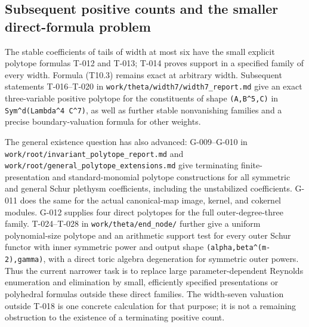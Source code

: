 \documentclass[
  10pt,
]{article}
\begin{document}
\subsection{Subsequent positive counts and the smaller direct-formula
problem}\label{subsequent-positive-counts-and-the-smaller-direct-formula-problem}

The stable coefficients of tails of width at most six have the small
explicit polytope formulas T-012 and T-013; T-014 proves support in a
specified family of every width. Formula (T10.3) remains exact at
arbitrary width. Subsequent statements T-016--T-020 in
\texttt{\small work/\allowbreak{}theta/\allowbreak{}width7/\allowbreak{}width7\_\allowbreak{}report.md}
give an exact three-variable positive polytope for the constituents of
shape
\texttt{\small (\allowbreak{}A,\allowbreak{}B\textasciicircum{}5,\allowbreak{}C)\allowbreak{}}
in
\texttt{\small Sym\textasciicircum{}d(\allowbreak{}Lambda\textasciicircum{}4 C\textasciicircum{}7)\allowbreak{}},
as well as further stable nonvanishing families and a precise
boundary-valuation formula for other weights.

The general existence question has also advanced: G-009--G-010 in
\texttt{\small work/\allowbreak{}root/\allowbreak{}invariant\_\allowbreak{}polytope\_\allowbreak{}report.md}
and
\texttt{\small work/\allowbreak{}root/\allowbreak{}general\_\allowbreak{}polytope\_\allowbreak{}extensions.md}
give terminating finite-presentation and standard-monomial polytope
constructions for all symmetric and general Schur plethysm coefficients,
including the unstabilized coefficients. G-011 does the same for the
actual canonical-map image, kernel, and cokernel modules. G-012 supplies
four direct polytopes for the full outer-degree-three family.
T-024--T-028 in
\texttt{\small work/\allowbreak{}theta/\allowbreak{}end\_\allowbreak{}node/\allowbreak{}}
further give a uniform polynomial-size polytope and an arithmetic
support test for every outer Schur functor with inner symmetric power
and output shape
\texttt{\small (\allowbreak{}alpha,\allowbreak{}beta\textasciicircum{}(\allowbreak{}m-\allowbreak{}2)\allowbreak{},\allowbreak{}gamma)\allowbreak{}},
with a direct toric algebra degeneration for symmetric outer powers.
Thus the current narrower task is to replace large parameter-dependent
Reynolds enumeration and elimination by small, efficiently specified
presentations or polyhedral formulas outside these direct families. The
width-seven valuation outside T-018 is one concrete calculation for that
purpose; it is not a remaining obstruction to the existence of a
terminating positive count.
\end{document}
